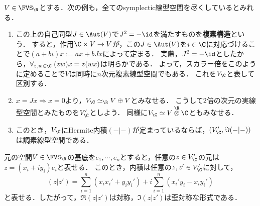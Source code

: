 \documentclass[uplatex,dvipdfmx]{jsreport}
\begin{document}
\begin{example}[複素構造の定めるsymplectic形式]
    $V\in\FVS_\R$とする．次の例も，全てのsymplectic線型空間を尽くしているとみれる．
    \begin{enumerate}
        \item この上の自己同型$J\in\Aut(V)$で$J^2=-\id$を満たすものを\textbf{複素構造}という．
        すると，作用$\C\times V\to V$が，この$J\in\Aut(V)$を$i\in\C$に対応づけることで$(a+bi)x:=ax+bJx$によって定まる．
        実際，$J^2=-\id$としたから，$\forall_{z,w\in\C}\;(zw)x=z(wx)$は明らかである．
        よって，スカラー倍をこのように定めることで$V$は同時に$n$次元複素線型空間でもある．
        これを$V_\C$と表して区別する．
        \item $x=Jx\Rightarrow x=0$より，$V_\C\simeq_\R V\oplus V$とみなせる．
        こうして2倍の次元の実線型空間とみたものを$V_\C'$としよう．
        同様に$V_\C\simeq V\overset{\R}{\otimes}\C$ともみなせる．
        \item このとき，$V_\C$にHermite内積$(-|-)$が定まっているならば，$(V_\C',\Im(-|-))$は調素線型空間である．
    \end{enumerate}
\end{example}
\begin{Proof}
    元の空間$V\in\FVS_\R$の基底を$e_1,\cdots,e_n$とすると，任意の$z\in V_\C'$の元は$z=(x_i+iy_i)e_i$と表せる．
    このとき，内積は任意の$z,z'\in V_\C'$に対して，
    \[(z|z')=\sum_{i=1}^n(x_ix_i'+y_iy_i')+i\sum_{i=1}^n(x_i'y_i-x_iy_i')\]
    と表せる．したがって，$\Re(z|z')$は対称，$\Im(z|z')$は歪対称な形式である．
\end{Proof}
\end{document}
